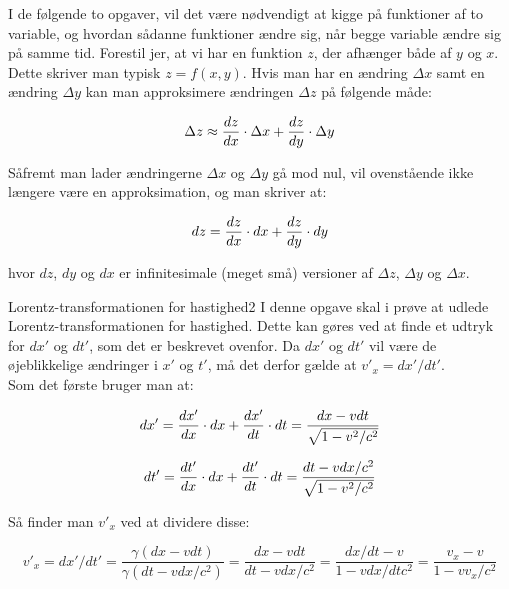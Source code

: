 I de følgende to opgaver, vil det være nødvendigt at kigge på funktioner af to variable, og hvordan sådanne funktioner ændre sig, når begge variable ændre sig på samme tid. 
Forestil jer, at  vi har en funktion $z$, der afhænger både af $y$ og $x$. Dette skriver man typisk $z=f \left( x,y \right)$. Hvis man har en ændring $\Delta x$ samt en ændring $\Delta y$ kan man approksimere ændringen $\Delta z$ på følgende måde:

$$\Delta z \approx {d{z} \over d{x}} \cdot \Delta x + {d{z} \over d{y}} \cdot \Delta y$$


Såfremt man lader ændringerne $\Delta x$ og $\Delta y$ gå mod nul, vil ovenstående ikke længere være en approksimation, og man skriver at:

$$dz = {d{z} \over d{x}} \cdot dx + {d{z} \over d{y}} \cdot dy$$


hvor $dz$, $dy$ og $dx$ er infinitesimale (meget små) versioner af $\Delta z$, $\Delta y$ og $\Delta x$.\\

\begin{opgave}{Lorentz-transformationen for hastighed}{2}
	I denne opgave skal i prøve at udlede Lorentz-transformationen for hastighed. Dette kan gøres ved at finde et udtryk for $dx'$ og $dt'$, som det er beskrevet ovenfor. Da $dx'$ og $dt'$ vil være de øjeblikkelige ændringer i $x'$ og $t'$, må det derfor gælde at $v'_x = dx'/dt'$.\\
	
	Som det første bruger man at:
	
	$$dx' = {d{x'} \over d{x}} \cdot dx + {d{x'} \over d{t}} \cdot dt = \frac{dx - v dt}{\sqrt{1- v^2 / c^2}} $$
	
	$$dt' = {d{t'} \over d{x}} \cdot dx + {d{t'} \over d{t}} \cdot dt = \frac{dt - v dx/c^2}{\sqrt{1- v^2 / c^2}}  $$
	
	Så finder man $v'_x$ ved at dividere disse:
	
	$$v'_x = dx'/dt' = \frac{\gamma (dx - v dt)}{\gamma (dt - v dx/c^2)} = \frac{dx - v dt}{dt - v dx/c^2} = \frac{dx/dt - v}{1 - v dx/dtc^2} = \frac{v_x - v}{1 - v v_x / c^2} $$
\end{opgave}

